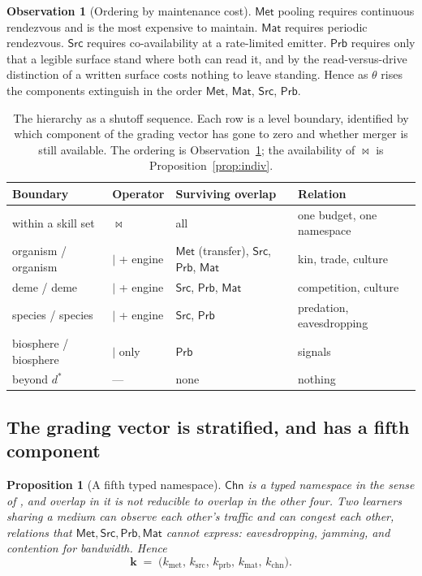 \documentclass[11pt]{article}
\theoremstyle{plain}
\newtheorem{proposition}[theorem]{Proposition}
\theoremstyle{definition}
\newtheorem{observation}[theorem]{Observation}
\theoremstyle{remark}
\newcommand{\Met}{\mathsf{Met}}
\newcommand{\Src}{\mathsf{Src}}
\newcommand{\Prb}{\mathsf{Prb}}
\newcommand{\Mat}{\mathsf{Mat}}
\newcommand{\Chn}{\mathsf{Chn}}
\newcommand{\Merge}{\bowtie}
\begin{document}
\begin{observation}[Ordering by maintenance cost]\label{obs:order}
$\Met$ pooling requires continuous rendezvous and is the most expensive to
maintain. $\Mat$ requires periodic rendezvous. $\Src$ requires
co-availability at a rate-limited emitter. $\Prb$ requires only that a
legible surface stand where both can read it, and by the read-versus-drive
distinction of \cite[\S5.1]{game} a written surface costs nothing to leave
standing. Hence as $\theta$ rises the components extinguish in the order
$\Met$, $\Mat$, $\Src$, $\Prb$.
\end{observation}

\begin{table}[t]
\centering\small
\begin{tabular}{@{}llll@{}}
\toprule
\textbf{Boundary} & \textbf{Operator} & \textbf{Surviving overlap}
& \textbf{Relation} \\
\midrule
within a skill set & $\Merge$ & all & one budget, one namespace \\
organism / organism & $\mid$ + engine & $\Met$ (transfer), $\Src$, $\Prb$, $\Mat$
& kin, trade, culture \\
deme / deme & $\mid$ + engine & $\Src$, $\Prb$, $\Mat$ & competition, culture \\
species / species & $\mid$ + engine & $\Src$, $\Prb$ & predation, eavesdropping \\
biosphere / biosphere & $\mid$ only & $\Prb$ & signals \\
beyond $d^\ast$ & --- & none & nothing \\
\bottomrule
\end{tabular}
\caption{The hierarchy as a shutoff sequence. Each row is a level boundary,
identified by which component of the grading vector has gone to zero and
whether merger is still available. The ordering is
Observation~\ref{obs:order}; the availability of $\Merge$ is
Proposition~\ref{prop:indiv}.}
\label{tab:levels}
\end{table}

\subsection{The grading vector is stratified, and has a fifth component}

\begin{proposition}[A fifth typed namespace]\label{prop:fifth}
$\Chn$ is a typed namespace in the sense of
\cite[Def.~4.1]{compose}, and overlap in it is not reducible to overlap in
the other four. Two learners sharing a medium can observe each other's
traffic and can congest each other, relations that
$\Met, \Src, \Prb, \Mat$ cannot express: eavesdropping, jamming, and
contention for bandwidth. Hence
\[
  \mathbf{k} \;=\; \bigl(k_{\mathrm{met}},\, k_{\mathrm{src}},\,
  k_{\mathrm{prb}},\, k_{\mathrm{mat}},\, k_{\mathrm{chn}}\bigr).
\]
\end{proposition}
\end{document}
